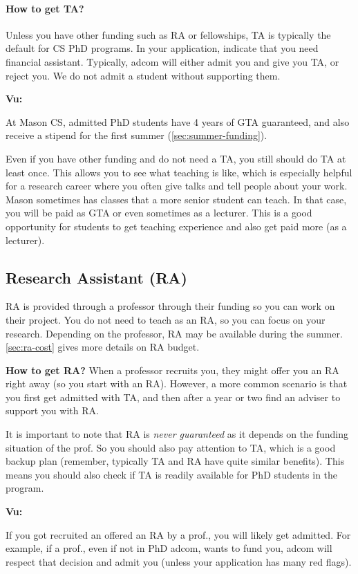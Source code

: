 \documentclass[oneside,11pt,dvipsnames]{book}
\newenvironment{commentbox}[1][]{
  \small
  \begin{mybox}
    {\small \textbf{#1}}
  }{
  \end{mybox}
}
\begin{document}
\paragraph{How to get TA?}  Unless you have other funding such as RA or fellowships, TA is typically the default for CS PhD programs. In your application, indicate that you need financial assistant. Typically, adcom will either admit you and give you TA, or reject you. We do not admit a student without supporting them.

\begin{commentbox}[Vu:]
  At Mason CS, admitted PhD students have 4 years of GTA guaranteed, and also receive a stipend for the first summer (\autoref{sec:summer-funding}).
\end{commentbox}

Even if you have other funding and do not need a TA, you still should do TA at least once.  This allows you to see what teaching is like, which is especially helpful for a research career where you often give talks and tell people about your work. Mason sometimes has classes that a more senior student can teach.  In that case, you will be paid as GTA or even sometimes as a lecturer.  This is a good opportunity for students to get teaching experience and also get paid more (as a lecturer).

\subsection{Research Assistant (RA)}\label{sec:ra}
RA is provided through a professor through their funding so you can work on their project.
You do not need to teach as an RA, so you can focus on your research. Depending on the professor, RA may be available during the summer. \autoref{sec:ra-cost} gives more details on RA budget.

\textbf{How to get RA?} When a professor recruits you, they might offer you an RA right away (so you start with an RA).  However, a more common scenario is that you first get admitted with TA, and then after a year or two find an adviser to support you with RA.

It is important to note that RA is \emph{never guaranteed} as it depends on the funding situation of the prof. So you should also pay attention to TA, which is a good backup plan (remember, typically TA and RA have quite similar benefits). This means you should also check if TA is readily available for PhD students in the program.


\begin{commentbox}[Vu:]
  If you got recruited an offered an RA by a prof., you will likely get admitted.  For example, if a prof., even if not in PhD adcom, wants to fund you, adcom will respect that decision and admit you (unless your application has many red flags).
\end{commentbox}
\end{document}
